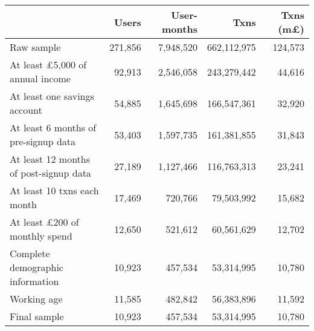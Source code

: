 \begin{tabular}{lrrrr}
\toprule
                                                   &   Users & User-months &        Txns & Txns (m\pounds) \\
\midrule
                                        Raw sample & 271,856 &   7,948,520 & 662,112,975 &         124,573 \\
            At least \pounds5,000 of annual income &  92,913 &   2,546,058 & 243,279,442 &          44,616 \\
                      At least one savings account &  54,885 &   1,645,698 & 166,547,361 &          32,920 \\
              At least 6 months of pre-signup data &  53,403 &   1,597,735 & 161,381,855 &          31,843 \\
            At least 12 months of post-signup data &  27,189 &   1,127,466 & 116,763,313 &          23,241 \\
                       At least 10 txns each month &  17,469 &     720,766 &  79,503,992 &          15,682 \\
              At least \pounds200 of monthly spend &  12,650 &     521,612 &  60,561,629 &          12,702 \\
                  Complete demographic information &  10,923 &     457,534 &  53,314,995 &          10,780 \\
                                       Working age &  11,585 &     482,842 &  56,383,896 &          11,592 \\
                                      Final sample &  10,923 &     457,534 &  53,314,995 &          10,780 \\
\bottomrule
\end{tabular}
